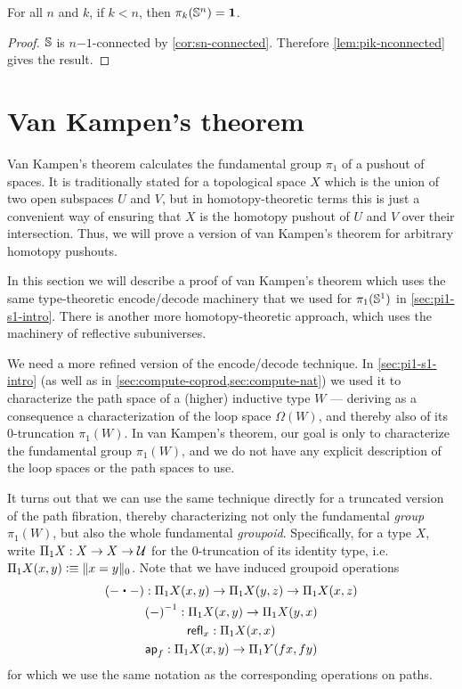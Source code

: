 \begin{cor}[$\pi_{k<n}(\Sn ^n)$]
For all $n$ and $k$, if $k < n$, then $\pi_k(\Sn ^n) = \unit$.  
\end{cor}
\begin{proof}
$\Sn$ is $n\mathord{-}1$-connected by \autoref{cor:sn-connected}.  Therefore
\autoref{lem:pik-nconnected} gives the result.  
\end{proof}

\section{Van Kampen's theorem}
\label{sec:van-kampen}

Van Kampen's theorem calculates the fundamental group $\pi_1$ of a pushout of spaces.
It is traditionally stated for a topological space $X$ which is the union of two open subspaces $U$ and $V$, but in homotopy-theoretic terms this is just a convenient way of ensuring that $X$ is the homotopy pushout of $U$ and $V$ over their intersection.
Thus, we will prove a version of van Kampen's theorem for arbitrary homotopy pushouts.

In this section we will describe a proof of van Kampen's theorem which uses the same type-theoretic encode/decode machinery that we used for $\pi_1(\Sn^1)$ in \autoref{sec:pi1-s1-intro}.
There is another more homotopy-theoretic approach, which uses the machinery of reflective subuniverses.

We need a more refined version of the encode/decode technique.
In \autoref{sec:pi1-s1-intro} (as well as in \autoref{sec:compute-coprod,sec:compute-nat}) we used it to characterize the path space of a (higher) inductive type $W$ --- deriving as a consequence a characterization of the loop space $\Omega(W)$, and thereby also of its 0-truncation $\pi_1(W)$.
In van Kampen's theorem, our goal is only to characterize the fundamental group $\pi_1(W)$, and we do not have any explicit description of the loop spaces or the path spaces to use.

It turns out that we can use the same technique directly for a truncated version of the path fibration, thereby characterizing not only the fundamental \emph{group} $\pi_1(W)$, but also the whole fundamental \emph{groupoid}.
Specifically, for a type $X$, write $\Pi_1 X: X\to X\to \type$ for the $0$-truncation of its identity type, i.e.\ $\Pi_1 X(x,y) \defeq \trunc0{x=y}$.
Note that we have induced groupoid operations
\begin{gather*}
  (-\ct-) : \Pi_1X(x,y) \to \Pi_1X(y,z) \to \Pi_1X(x,z)\\
  \opp{(-)} : \Pi_1X(x,y) \to \Pi_1X(y,x)\\
  \refl{x} : \Pi_1X(x,x)\\
  \apfunc{f} : \Pi_1X(x,y) \to \Pi_1Y(fx,fy)
\end{gather*}
for which we use the same notation as the corresponding operations on paths.


